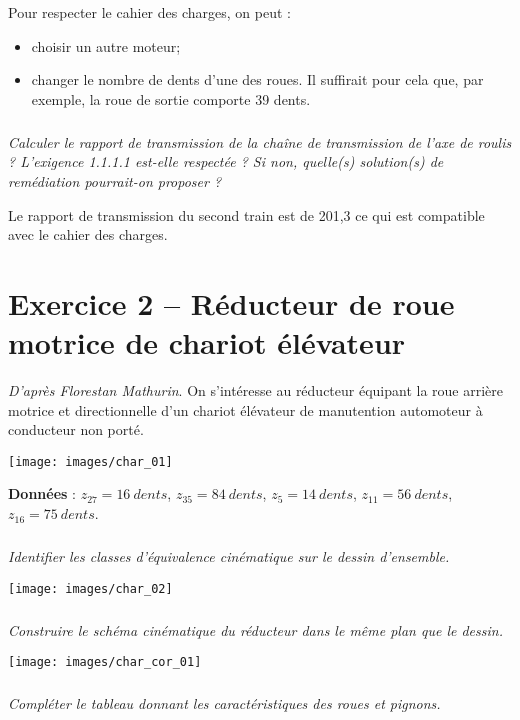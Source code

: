 \documentclass[10pt,fleqn]{article} %
\begin{document}
\begin{multicols}{2}
\begin{corrige}
Pour respecter le cahier des charges, on peut :
\begin{itemize}
\item choisir un autre moteur;
\item changer le nombre de dents d'une des roues. Il suffirait pour cela que,  par exemple, la roue de sortie comporte 39 dents. 
\end{itemize}
\end{corrige}
\else
\fi

\subparagraph{}
\textit{Calculer le rapport de transmission de la chaîne de transmission de l'axe de roulis ? L'exigence 1.1.1.1 est-elle respectée ? Si non, quelle(s) solution(s) de remédiation pourrait-on proposer ?}
\ifprof
\begin{corrige}
Le rapport de transmission du second train est de 201,3 ce qui est compatible avec le cahier des charges.
\end{corrige}
\else
\fi


\section*{Exercice 2 -- Réducteur de roue motrice de chariot élévateur}
\textit{D'après Florestan Mathurin}. 
\setcounter{exo}{0}
On s’intéresse au réducteur équipant la roue arrière motrice et directionnelle d’un chariot élévateur de manutention automoteur à conducteur non porté. 



\begin{center}
\texttt{[image: images/char\_01]}
\end{center}


\textbf{Données }: $z_{27} = \SI{16}{dents}$, $z_{35} = \SI{84}{dents}$, $z_{5} = \SI{14}{dents}$, $z_{11} = \SI{56}{dents}$, $z_{16} = \SI{75}{dents}$. 


\subparagraph{}
\textit{Identifier les classes d’équivalence cinématique sur le dessin d’ensemble. }
\ifprof
\begin{corrige}

\end{corrige}
\else
\fi

\begin{center}
\texttt{[image: images/char\_02]}
\end{center}


\subparagraph{}
\textit{ Construire le schéma cinématique du réducteur dans le même plan que le dessin.}
\ifprof
\begin{corrige}
\begin{center}
\texttt{[image: images/char\_cor\_01]}
\end{center}
\end{corrige}
\else
\fi
\subparagraph{}
\textit{Compléter le tableau donnant les caractéristiques des roues et pignons.}
\ifprof
\begin{corrige}
\end{corrige}
\else
\fi


\end{multicols}
\end{document}
